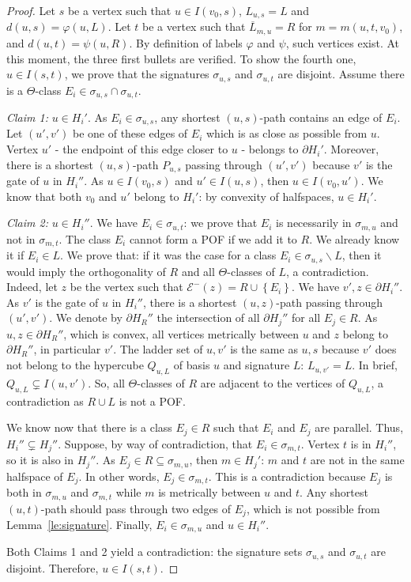 \documentclass{article}
\newcommand{\set}[1]{\left\{ #1 \right\}}
\begin{document}
\begin{proof}
Let $s$ be a vertex such that $u \in I(v_0,s)$, $L_{u,s} = L$ and $d(u,s) = \varphi(u,L)$. Let $t$ be a vertex such that $\overline{L}_{m,u} = R$ for $m = m(u,t,v_0)$, and $d(u,t) = \psi(u,R)$.
By definition of labels $\varphi$ and $\psi$, such vertices exist.
At this moment, the three first bullets are verified.
To show the fourth one, $u \in I(s,t)$, we prove that the signatures $\sigma_{u,s}$ and $\sigma_{u,t}$ are disjoint. Assume there is a $\Theta$-class $E_i \in \sigma_{u,s} \cap \sigma_{u,t}$.

\textit{Claim 1:} $u \in H_i'$.
As $E_i \in \sigma_{u,s}$, any shortest $(u,s)$-path contains an edge of $E_i$. Let $(u',v')$ be one of these edges of $E_i$ which is as close as possible from $u$. Vertex $u'$ - the endpoint of this edge closer to $u$ - belongs to $\partial H_i'$. Moreover, there is a shortest $(u,s)$-path $P_{u,s}$ passing through $(u',v')$ because $v'$ is the gate of $u$ in $H_i''$. As $u \in I(v_0,s)$ and $u' \in I(u,s)$, then $u \in I(v_0,u')$. We know that both $v_0$ and $u'$ belong to $H_i'$: by convexity of halfspaces, $u \in H_i'$. 

\textit{Claim 2:} $u \in H_i''$. We have $E_i \in \sigma_{u,t}$: we prove that $E_i$ is necessarily in $\sigma_{m,u}$ and not in $\sigma_{m,t}$. The class $E_i$ cannot form a POF if we add it to $R$. We already know it if $E_i \in L$. We prove that: if it was the case for a class $E_i \in \sigma_{u,s} \backslash L$, then it would imply the orthogonality of $R$ and all $\Theta$-classes of $L$, a contradiction. Indeed, let $z$ be the vertex such that $\mathcal{E}^-(z) = R \cup \set{E_i}$. We have $v',z \in \partial H_i''$. As $v'$ is the gate of $u$ in $H_i''$, there is a shortest $(u,z)$-path passing through $(u',v')$. We denote by $\partial H_R''$ the intersection of all $\partial H_j''$ for all $E_j \in R$. As $u,z \in \partial H_R''$, which is convex, all vertices metrically between $u$ and $z$ belong to $\partial H_R''$, in particular $v'$. The ladder set of $u,v'$ is the same as $u,s$ because $v'$ does not belong to the hypercube $Q_{u,L}$ of basis $u$ and signature $L$: $L_{u,v'} = L$. In brief, $Q_{u,L} \subsetneq I(u,v')$. So, all $\Theta$-classes of $R$ are adjacent to the vertices of $Q_{u,L}$, a contradiction as $R \cup L$ is not a POF.
 
We know now that there is a class $E_j \in R$ such that $E_i$ and $E_j$ are parallel. Thus, $H_i'' \subsetneq H_j''$. Suppose, by way of contradiction, that $E_i \in \sigma_{m,t}$. Vertex $t$ is in $H_i''$, so it is also in $H_j''$. As $E_j \in R \subseteq \sigma_{m,u}$, then $m \in H_j'$: $m$ and $t$ are not in the same halfspace of $E_j$. In other words, $E_j \in \sigma_{m,t}$. This is a contradiction because $E_j$ is both in $\sigma_{m,u}$ and $\sigma_{m,t}$ while $m$ is metrically between $u$ and $t$. Any shortest $(u,t)$-path should pass through two edges of $E_j$, which is not possible from Lemma~\ref{le:signature}. Finally, $E_i \in \sigma_{m,u}$ and $u \in H_i''$.

Both Claims 1 and 2 yield a contradiction: the signature sets $\sigma_{u,s}$ and $\sigma_{u,t}$ are disjoint. Therefore, $u \in I(s,t)$.
\end{proof}
\end{document}
